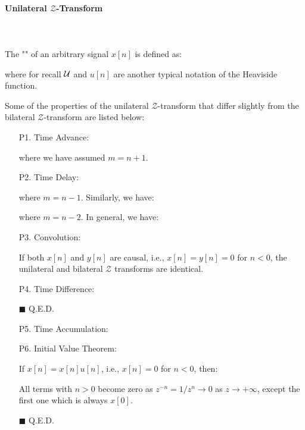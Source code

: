 	
	\paragraph{Unilateral $\mathcal{Z}$-Transform}\mbox{}\\\\
	The "" of an arbitrary signal $x[n]$ is defined as:
	
	where for recall $\cal U$ and $u[n]$ are another typical notation of the Heaviside function.
	
	Some of the properties of the unilateral $\mathcal{Z}$-transform that differ slightly from the bilateral $\mathcal{Z}$-transform are listed below:
	\begin{enumerate}
		\item[P1.] Time Advance:
		
		where we have assumed $m=n+1$.
		
		\item[P2.] Time Delay:
		
		where $m=n-1$. Similarly, we have:
		
		where $m=n-2$. In general, we have:
		
		
		\item[P3.] Convolution:
		
		If both $x[n]$ and $y[n]$ are causal, i.e., $x[n]=y[n]=0$ for $n<0$, the unilateral and bilateral $\mathcal{Z}$ transforms are identical.
		
		\item[P4.] Time Difference:
		
		\begin{dem}
		
		\begin{flushright}
			$\blacksquare$  Q.E.D.
		\end{flushright}
		\end{dem} 
		
		
		\item[P5.] Time Accumulation:
		
		
		\item[P6.] Initial Value Theorem:
		
		If $x[n]=x[n]u[n]$, i.e., $x[n]=0$ for $n<0$, then:
		
		\begin{dem}
		
		All terms with $n>0$ become zero as $z^{-n}=1/z^n \rightarrow 0$ as 
		$z \rightarrow {+\infty}$, except the first one which is always $x[0]$.
		\begin{flushright}
			$\blacksquare$  Q.E.D.
		\end{flushright}
		\end{dem}		
		

\end{enumerate}
